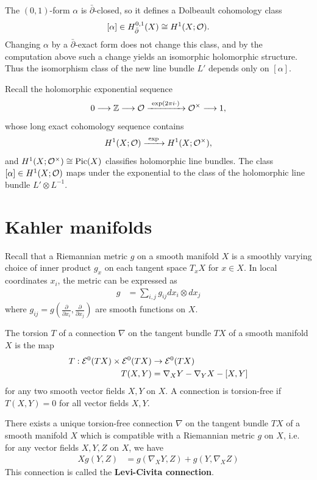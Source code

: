 \documentclass[12pt]{article}
\begin{document}
\begin{solution}
The $(0,1)$-form $\alpha$ is $\bar\partial$-closed, so it defines a
Dolbeault cohomology class
\[
[\alpha]\in H^{0,1}_{\bar\partial}(X)
\cong H^1(X;{\mathcal{O}}).
\]
Changing $\alpha$ by a $\bar\partial$-exact form does not change this
class, and by the computation above such a change yields an isomorphic
holomorphic structure.  Thus the isomorphism class of the new line
bundle $L'$ depends only on $[\alpha]$.

Recall the holomorphic exponential sequence
\[
0\longrightarrow \mathbb{Z}
\longrightarrow {\mathcal{O}}
\xrightarrow{\ \exp(2\pi i \cdot)\ } {\mathcal{O}}^\times
\longrightarrow 1,
\]
whose long exact cohomology sequence contains
\[
H^1(X;{\mathcal{O}}) \xrightarrow{\ \exp\ } H^1(X;{\mathcal{O}}^\times),
\]
and $H^1(X;{\mathcal{O}}^\times)\cong\operatorname{Pic}(X)$ classifies holomorphic line bundles.
The class $[\alpha]\in H^1(X;{\mathcal{O}})$ maps under the exponential to the
class of the holomorphic line bundle $L'\otimes L^{-1}$. 
\end{solution}


\section{Kahler manifolds}
Recall that a Riemannian metric $g$ on a smooth manifold $X$ is a smoothly varying choice of inner product $g_x$ on each tangent space $T_x X$ for $x \in X$. In local coordinates $x_i$, the metric can be expressed as \begin{align*}
    g & = \sum_{i,j} g_{ij} d x_i \otimes d x_j
\end{align*} where $g_{ij} = g\left( \frac{\partial}{\partial x_i}, \frac{\partial}{\partial x_j} \right)$ are smooth functions on $X$.

\begin{definition}
    The torsion $T$ of a connection $\nabla$ on the tangent bundle $TX$ of a smooth manifold $X$ is the map \begin{align*}
        T: {\mathcal{E}}^0(TX) \times {\mathcal{E}}^0(TX) & \to {\mathcal{E}}^0(TX) \\
        T(X,Y) & = \nabla_X Y - \nabla_Y X - [X,Y]
    \end{align*} for any two smooth vector fields $X,Y$ on $X$. A connection is torsion-free if $T(X,Y) = 0$ for all vector fields $X,Y$.
\end{definition}

\begin{theorem}
    There exists a unique torsion-free connection $\nabla$ on the tangent bundle $TX$ of a smooth manifold $X$ which is compatible with a Riemannian metric $g$ on $X$, i.e. for any vector fields $X,Y,Z$ on $X$, we have \begin{align*}
        X g(Y,Z) & = g(\nabla_X Y, Z) + g(Y, \nabla_X Z)
    \end{align*} This connection is called the \textbf{Levi-Civita connection}.
\end{theorem}
\end{document}
